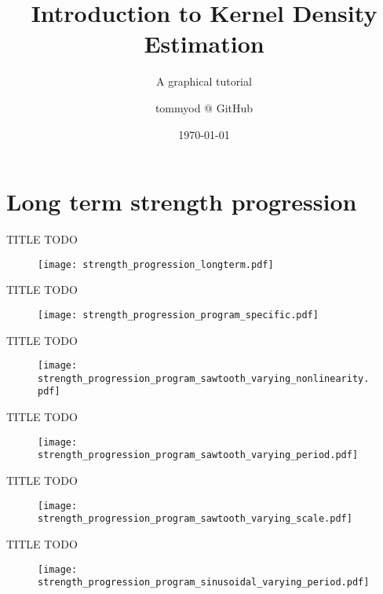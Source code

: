 \documentclass[11pt, aspectratio=149]{beamer}
\title{Introduction to Kernel Density Estimation}
\subtitle{A graphical tutorial}
\date{\today}
\author{tommyod @ GitHub}
\theoremstyle{plain}
\begin{document}
\maketitle

\section{Long term strength progression}

\begin{frame}[fragile, t]{TITLE}
	\vfill
	TODO
	\vfill
	\begin{figure}
		\centering
		\texttt{[image: strength\_progression\_longterm.pdf]}
	\end{figure}
	\vfill
\end{frame}

\begin{frame}[fragile, t]{TITLE}
	\vfill
	TODO
	\vfill
	\begin{figure}
		\centering
		\texttt{[image: strength\_progression\_program\_specific.pdf]}
	\end{figure}
	\vfill
\end{frame}


\begin{frame}[fragile, t]{TITLE}
	\vfill
	TODO
	\vfill
	\begin{figure}
		\centering
		\texttt{[image: strength\_progression\_program\_sawtooth\_varying\_nonlinearity.pdf]}
	\end{figure}
	\vfill
\end{frame}


\begin{frame}[fragile, t]{TITLE}
	\vfill
	TODO
	\vfill
	\begin{figure}
		\centering
		\texttt{[image: strength\_progression\_program\_sawtooth\_varying\_period.pdf]}
	\end{figure}
	\vfill
\end{frame}

\begin{frame}[fragile, t]{TITLE}
	\vfill
	TODO
	\vfill
	\begin{figure}
		\centering
		\texttt{[image: strength\_progression\_program\_sawtooth\_varying\_scale.pdf]}
	\end{figure}
	\vfill
\end{frame}


\begin{frame}[fragile, t]{TITLE}
	\vfill
	TODO
	\vfill
	\begin{figure}
		\centering
		\texttt{[image: strength\_progression\_program\_sinusoidal\_varying\_period.pdf]}
	\end{figure}
	\vfill
\end{frame}
\end{document}
